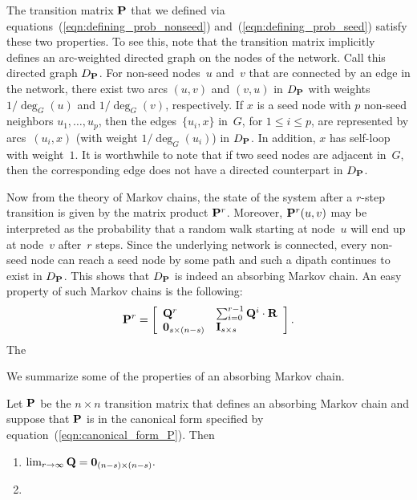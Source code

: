 The transition matrix $\mathbf{P}$ that we defined via equations~(\ref{eqn:defining_prob_nonseed}) 
and~(\ref{eqn:defining_prob_seed}) satisfy these two properties. To see this, note that 
the transition matrix implicitly defines an arc-weighted  directed graph on the nodes 
of the network. Call this directed graph $D_{\mathbf{P}}$. For non-seed nodes~$u$ and~$v$ that 
are connected by an edge in the network, there exist two arcs $(u, v)$ and $(v, u)$ 
in $D_{\mathbf{P}}$ with weights $1/\deg_{G}(u)$ and $1/\deg_{G}(v)$, respectively. If $x$ 
is a seed node with $p$ non-seed neighbors $u_1, \ldots, u_p$, then the edges~$\{u_i, x\}$ 
in~$G$, for $1 \leq i \leq p$, are represented by arcs~$(u_i, x)$ (with weight $1 /\deg_G(u_i)$) 
in $D_{\mathbf{P}}$. In addition, $x$ has self-loop with weight~$1$. It is worthwhile to note 
that if two seed nodes are adjacent in~$G$, then the corresponding edge does not have a 
directed counterpart in $D_{\mathbf{P}}$.  

Now from the theory of Markov chains, the state of the system after a $r$-step transition 
is given by the matrix product $\mathbf{P}^r$. Moreover, $\mathbf{P}^r (u, v)$ may be interpreted 
as the probability that a random walk starting at node~$u$ will end up at node~$v$ 
after~$r$ steps. Since the underlying network is connected, every non-seed node can reach a seed
node by some path and such a dipath continues to exist in $D_{\mathbf{P}}$. This shows that $D_{\mathbf{P}}$
is indeed an absorbing Markov chain. An easy property of such Markov chains is the following:
\begin{equation}\label{exp:rth_product_of_P}
	\mathbf{P}^r = \left [ \begin{array}{ll}
						\mathbf{Q}^r  					& \sum_{i = 0}^{r - 1}\mathbf{Q}^i \cdot \mathbf{R} \\
						 \mathbf{0}_{s \times (n - s)} & \mathbf{I}_{s \times s}
						\end{array}
				\right ].
\end{equation}  
The 

We summarize some of the properties of an absorbing Markov chain. 
\begin{proposition}\label{prop:limiting_Q}
	Let $\mathbf{P}$ be the $n \times n$ transition matrix that defines an absorbing Markov chain
	and suppose that $\mathbf{P}$ is in the canonical form specified by equation~(\ref{eqn:canonical_form_P}). 
	Then
	\begin{enumerate}
		\item $\lim_{r \to \infty} \mathbf{Q} = \mathbf{0}_{(n - s) \times (n - s)}.$
		\item 
	\end{enumerate} 
\end{proposition}
